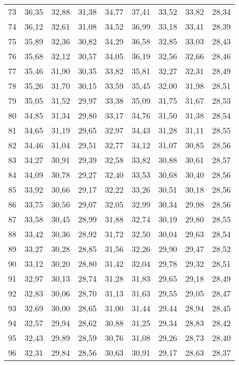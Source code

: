 \begin{longtable}{c c c c c c c c c}
73	& 36,35	& 32,88	& 31,38	& 34,77	& 37,41	& 33,52	& 33,82	& 28,34 \\
74	& 36,12	& 32,61	& 31,08	& 34,52	& 36,99	& 33,18	& 33,41	& 28,39 \\
75	& 35,89	& 32,36	& 30,82	& 34,29	& 36,58	& 32,85	& 33,03	& 28,43 \\
76	& 35,68	& 32,12	& 30,57	& 34,05	& 36,19	& 32,56	& 32,66	& 28,46 \\
77	& 35,46	& 31,90	& 30,35	& 33,82	& 35,81	& 32,27	& 32,31	& 28,49 \\
78	& 35,26	& 31,70	& 30,15	& 33,59	& 35,45	& 32,00	& 31,98	& 28,51 \\
79	& 35,05	& 31,52	& 29,97	& 33,38	& 35,09	& 31,75	& 31,67	& 28,53 \\
80	& 34,85	& 31,34	& 29,80	& 33,17	& 34,76	& 31,50	& 31,38	& 28,54 \\
81	& 34,65	& 31,19	& 29,65	& 32,97	& 34,43	& 31,28	& 31,11	& 28,55 \\
82	& 34,46	& 31,04	& 29,51	& 32,77	& 34,12	& 31,07	& 30,85	& 28,56 \\
83	& 34,27	& 30,91	& 29,39	& 32,58	& 33,82	& 30,88	& 30,61	& 28,57 \\
84	& 34,09	& 30,78	& 29,27	& 32,40	& 33,53	& 30,68	& 30,40	& 28,56 \\
85	& 33,92	& 30,66	& 29,17	& 32,22	& 33,26	& 30,51	& 30,18	& 28,56 \\
86	& 33,75	& 30,56	& 29,07	& 32,05	& 32,99	& 30,34	& 29,98	& 28,56 \\
87	& 33,58	& 30,45	& 28,99	& 31,88	& 32,74	& 30,19	& 29,80	& 28,55 \\
88	& 33,42	& 30,36	& 28,92	& 31,72	& 32,50	& 30,04	& 29,63	& 28,54 \\
89	& 33,27	& 30,28	& 28,85	& 31,56	& 32,26	& 29,90	& 29,47	& 28,52 \\
90	& 33,12	& 30,20	& 28,80	& 31,42	& 32,04	& 29,78	& 29,32	& 28,51 \\
91	& 32,97	& 30,13	& 28,74	& 31,28	& 31,83	& 29,65	& 29,18	& 28,49 \\
92	& 32,83	& 30,06	& 28,70	& 31,13	& 31,63	& 29,55	& 29,05	& 28,47 \\
93	& 32,69	& 30,00	& 28,65	& 31,00	& 31,44	& 29,44	& 28,94	& 28,45 \\
94	& 32,57	& 29,94	& 28,62	& 30,88	& 31,25	& 29,34	& 28,83	& 28,42 \\
95	& 32,43	& 29,89	& 28,59	& 30,76	& 31,08	& 29,26	& 28,73	& 28,40 \\
96	& 32,31	& 29,84	& 28,56	& 30,63	& 30,91	& 29,17	& 28,63	& 28,37 \\

\end{longtable}
